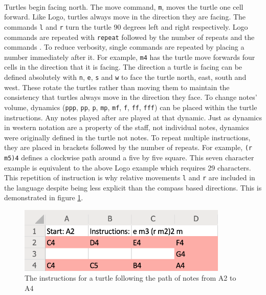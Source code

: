 \paragraph{} Turtles begin facing north. The move command, \texttt{m}, moves the turtle one cell forward. Like Logo, turtles always move in the direction they are facing. The commands \texttt{l} and \texttt{r} turn the turtle 90 degrees left and right respectively. Logo commands are repeated with \texttt{repeat} followed by the number of repeats and the commands \cite{goldman:turtle}. To reduce verbosity, single commands are repeated by placing a number immediately after it. For example, \texttt{m4} has the turtle move forwards four cells in the direction that it is facing. The direction a turtle is facing can be defined absolutely with \texttt{n}, \texttt{e}, \texttt{s} and \texttt{w} to face the turtle north, east, south and west. These rotate the turtles rather than moving them to maintain the consistency that turtles always move in the direction they face. To change notes' volume, dynamics (\texttt{ppp}, \texttt{pp}, \texttt{p}, \texttt{mp}, \texttt{mf}, \texttt{f}, \texttt{ff}, \texttt{fff}) can be placed within the turtle instructions. Any notes played after are played at that dynamic. Just as dynamics in western notation are a property of the staff, not individual notes, dynamics were originally defined in the turtle not notes. To repeat multiple instructions, they are placed in brackets followed by the number of repeats. For example, \texttt{(r m5)4}  defines a clockwise path around a five by five square. This seven character example is equivalent to the above Logo example which requires 29 characters. This repetition of instruction is why relative movements \texttt{l} and \texttt{r} are included in the language despite being less explicit than the compass based directions. This is demonstrated in figure \ref{prep:language1}.

\begin{figure}[ht]
  \centerline{\includegraphics[width=100mm]{figs/diss1.png}}
\caption{The instructions for a turtle following the path of notes from A2 to A4}
\label{prep:language1}
\end{figure}

